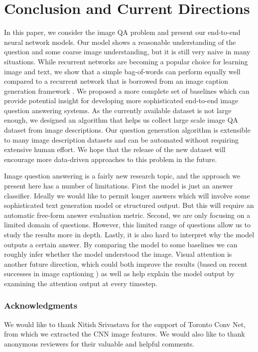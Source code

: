\documentclass{article} %
\renewcommand{\#}[1]{\textbf{#1}}
\begin{document}
\section{Conclusion and Current Directions}

In this paper, we consider the image QA problem and present our end-to-end
neural network models. Our model shows a reasonable understanding of the
question and some coarse image understanding, but it is still very naive in
many situations. While recurrent networks are becoming a popular choice for
learning image and text, we show that a simple bag-of-words can perform equally
well compared to a recurrent network that is borrowed from an image caption
generation framework \cite{vinyals14}. We proposed a more complete set of
baselines which can provide potential insight for developing more sophisticated
end-to-end image question answering systems. As the currently available dataset
is not large enough, we designed an algorithm that helps us collect large scale
image QA dataset from image descriptions. Our question generation algorithm is
extensible to many image description datasets and can be automated without
requiring extensive human effort. We hope that the release of the new dataset
will encourage more data-driven approaches to this problem in the future.

Image question answering is a fairly new research topic, and the approach we
present here has a number of limitations. First the model is just an answer
classifier. Ideally we would like to permit longer answers which will involve
some sophisticated text generation model or structured output. But this will
require an automatic free-form answer evaluation metric. Second, we are only
focusing on a limited domain of questions. However, this limited range of
questions allow us to study the results more in depth. Lastly, it is also hard
to interpret why the model outputs a certain answer. By comparing the model to
some baselines we can roughly infer whether the model understood the image.
Visual attention is another future direction, which could both improve the
results (based on recent successes in image captioning \cite{xu15}) as well as
help explain the model output by examining the attention output at every
timestep.

\subsubsection*{Acknowledgments}

We would like to thank Nitish Srivastava for the support of Toronto Conv Net,
from which we extracted the CNN image features. We would also like to thank
anonymous reviewers for their valuable and helpful comments.

\begin{small}


\end{small}
\end{document}
